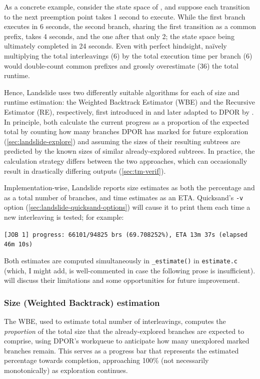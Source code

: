 As a concrete example, consider the state space of ,
and suppose each transition to the next preemption point takes 1 second to execute.
While the first branch executes in 6 seconds,
the second branch, sharing the first transition as a common prefix, takes 4 seconds,
and the one after that only 2;
the state space being ultimately completed in 24 seconds.
Even with perfect hindsight,
na\"ively multiplying the total interleavings (6)
by the total execution time per branch (6) would double-count common prefixes
and grossly overestimate (36) the total runtime.

Hence, Landslide uses two differently suitable algorithms for each of size and runtime estimation:
the Weighted Backtrack Estimator (WBE) and the Recursive Estimator (RE), respectively,
first introduced in \cite{estimating-search-tree-size} and later adapted to DPOR by \cite{estimation}.
In principle, both calculate the current progress as a proportion of the expected total
by counting how many branches DPOR has marked for future exploration (\cref{sec:landslide-explore})
and assuming the sizes of their resulting subtrees are predicted by the known sizes of similar already-explored subtrees.
In practice, the calculation strategy differs between the two approaches,
which can occasionally result in drastically differing outputs (\cref{sec:tm-verif}).

Implementation-wise, Landslide reports size estimates as both the percentage and as a total number of branches,
and time estimates as an ETA.
Quicksand's {\tt -v} option (\cref{sec:landslide-quicksand-options})
will cause it to print them each time a new interleaving is tested; for example:
\begin{center}
	{\tt \small [JOB 1] progress: 66101/94825 brs (69.708252\%), ETA 13m 37s (elapsed 46m 10s)}
\end{center}
Both estimates are computed simultaneously in {\tt \_estimate()} in {\tt estimate.c}
(which, I might add, is well-commented in case the following prose is insufficient).
 will discuss their limitations and some opportunities for future improvement.

\subsubsection{Size (Weighted Backtrack) estimation}

The WBE, used to estimate total number of interleavings,
computes the {\em proportion} of the total size
that the already-explored branches are expected to comprise,
using DPOR's workqueue to anticipate how many unexplored marked branches remain.
This serves as a progress bar \cite{progress-bar} that represents the estimated percentage towards completion,
approaching 100\% (not necessarily monotonically) as exploration continues.


